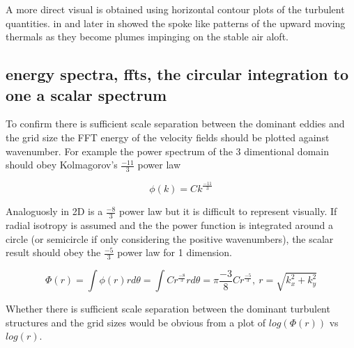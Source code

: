 A more direct visual is obtained using horizontal contour plots of the turbulent quantities. \citeauthor{SchmidtSchu} in \cite{SchmidtSchu}
and later \citeauthor{SullMoengStev} in \cite{SullMoengStev} showed the spoke like patterns of the upward moving thermals as they become plumes impinging on
the stable air aloft.\\    
\subsection{energy spectra, ffts, the circular integration to one a scalar spectrum}

To confirm there is sufficient scale separation between the dominant eddies and the grid size
the \acs{FFT} energy of the velocity fields should be plotted against wavenumber.  For example
 the power spectrum of the 3 dimentional domain should obey Kolmagorov's $\frac{-11}{3}$ power law

\begin{equation}
\phi(k) = Ck^{\frac{-11}{3}}
\end{equation}

Analoguosly in 2D is a $\frac{-8}{3}$ power law but it is difficult to represent visually.
If radial isotropy is assumed and the the power function is integrated around a circle 
(or semicircle if only considering the positive wavenumbers), the scalar result should
obey the $\frac{-5}{3}$ power law for 1 dimension.


\begin{equation}
\Phi(r) = \int \phi(r) r d\theta = \int Cr^{\frac{-8}{3}} r d\theta = \pi \frac{-3}{8} C r^{\frac{-5}{3}}, \ r=\sqrt{k_{x}^{2} + k_{y}^{2}}
\end{equation}
 
Whether there is sufficient scale separation between the dominant turbulent structures
and the grid sizes would be obvious from a  plot of $log(\Phi(r))$ vs $log(r)$.

